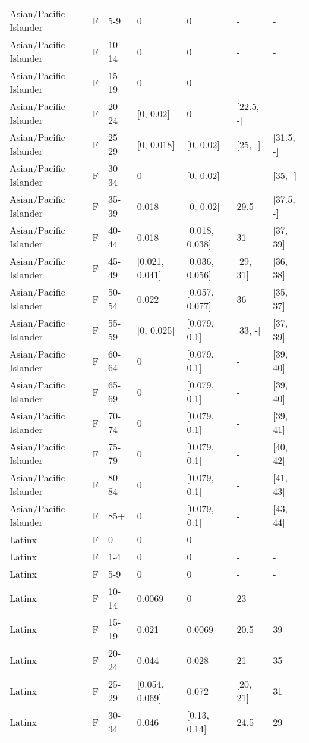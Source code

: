 \begin{table}[ht]
\begin{tabular}{lllllll}
  Asian/Pacific Islander & F & 5-9 & 0 & 0 & - & - \\ 
  Asian/Pacific Islander & F & 10-14 & 0 & 0 & - & - \\ 
  Asian/Pacific Islander & F & 15-19 & 0 & 0 & - & - \\ 
  Asian/Pacific Islander & F & 20-24 & [0, 0.02] & 0 & [22.5, -] & - \\ 
  Asian/Pacific Islander & F & 25-29 & [0, 0.018] & [0, 0.02] & [25, -] & [31.5, -] \\ 
  Asian/Pacific Islander & F & 30-34 & 0 & [0, 0.02] & - & [35, -] \\ 
  Asian/Pacific Islander & F & 35-39 & 0.018 & [0, 0.02] & 29.5 & [37.5, -] \\ 
  Asian/Pacific Islander & F & 40-44 & 0.018 & [0.018, 0.038] & 31 & [37, 39] \\ 
  Asian/Pacific Islander & F & 45-49 & [0.021, 0.041] & [0.036, 0.056] & [29, 31] & [36, 38] \\ 
  Asian/Pacific Islander & F & 50-54 & 0.022 & [0.057, 0.077] & 36 & [35, 37] \\ 
  Asian/Pacific Islander & F & 55-59 & [0, 0.025] & [0.079, 0.1] & [33, -] & [37, 39] \\ 
  Asian/Pacific Islander & F & 60-64 & 0 & [0.079, 0.1] & - & [39, 40] \\ 
  Asian/Pacific Islander & F & 65-69 & 0 & [0.079, 0.1] & - & [39, 40] \\ 
  Asian/Pacific Islander & F & 70-74 & 0 & [0.079, 0.1] & - & [39, 41] \\ 
  Asian/Pacific Islander & F & 75-79 & 0 & [0.079, 0.1] & - & [40, 42] \\ 
  Asian/Pacific Islander & F & 80-84 & 0 & [0.079, 0.1] & - & [41, 43] \\ 
  Asian/Pacific Islander & F & 85+ & 0 & [0.079, 0.1] & - & [43, 44] \\ 
  Latinx & F & 0 & 0 & 0 & - & - \\ 
  Latinx & F & 1-4 & 0 & 0 & - & - \\ 
  Latinx & F & 5-9 & 0 & 0 & - & - \\ 
  Latinx & F & 10-14 & 0.0069 & 0 & 23 & - \\ 
  Latinx & F & 15-19 & 0.021 & 0.0069 & 20.5 & 39 \\ 
  Latinx & F & 20-24 & 0.044 & 0.028 & 21 & 35 \\ 
  Latinx & F & 25-29 & [0.054, 0.069] & 0.072 & [20, 21] & 31 \\ 
  Latinx & F & 30-34 & 0.046 & [0.13, 0.14] & 24.5 & 29 \\ 

\end{tabular}
\end{table}
